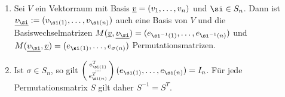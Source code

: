 \documentclass[../../main.tex]{subfiles}
\begin{document}
\begin{bem}\label{13.5.6}
\begin{enumerate}[\normalfont(a)]
\item Sei $V$ ein Vektorraum mit Basis ${\underline v}=(v_1,\ldots ,v_n)$ und $\si\in S_n$. Dann ist $\underline{v_{\si}}:=(v_{\si(1)},\ldots ,v_{\si(n)})$ auch eine Basis von $V$ und die Basiswechselmatrizen $M(\underline{v},\underline{v_{\si}})=(e_{\si^{-1}(1)},\ldots ,e_{\si^{-1}(n)})$ und $M(\underline{v_{\si}},\v)=(e_{\si^{}(1)},\ldots ,e_{\sigma^{}(n)})$ Permutationsmatrizen.
\item Ist $\sigma\in S_n$, so gilt $\cvec{e^T_{\si(1)}\\\ldots \\ e^T_{\si(n)}}(e_{\si(1)},\ldots ,e_{\si(n)})=I_n$. Für jede Permutationsmatrix $S$ gilt daher $S^{-1}=S^T$.
\end{enumerate}
\end{bem}
\end{document}
